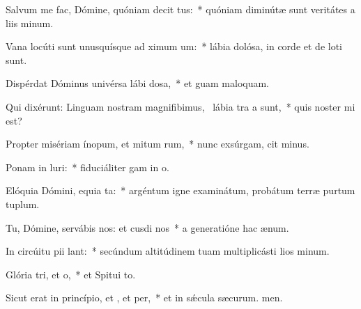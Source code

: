 \item Salvum me fac, Dómine, quóniam decit tus:~* quóniam diminútæ sunt veritátes a liis minum.
\item Vana locúti sunt unusquísque ad ximum um:~* lábia dolósa, in corde et de loti sunt.
\item Dispérdat Dóminus univérsa lábi dosa,~* et guam maloquam.
\item Qui dixérunt: Linguam nostram magnifibimus,~\pscross{} lábia tra a  sunt,~* quis noster mi est?
\item Propter misériam ínopum, et mitum rum,~* nunc exsúrgam, cit minus.
\item Ponam in luri:~* fiduciáliter gam in o.
\item Elóquia Dómini, equia ta:~* argéntum igne examinátum, probátum terræ purtum tuplum.
\item Tu, Dómine, servábis nos: et cusdi nos~* a generatióne hac  ænum.
\item In circúitu pii lant:~* secúndum altitúdinem tuam multiplicásti lios minum.
\item Glória tri, et o,~* et Spitui to.
\item Sicut erat in princípio, et , et per,~* et in sǽcula sæcurum. men.
